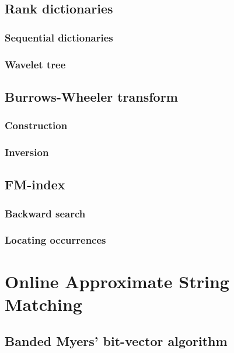 \section{Rank dictionaries}
\subsection{Sequential dictionaries}
\subsection{Wavelet tree}
\section{Burrows-Wheeler transform}
\subsection{Construction}
\subsection{Inversion}
\section{FM-index}
\subsection{Backward search}
\subsection{Locating occurrences}


\chapter{Online Approximate String Matching}
\section{Banded Myers' bit-vector algorithm}
